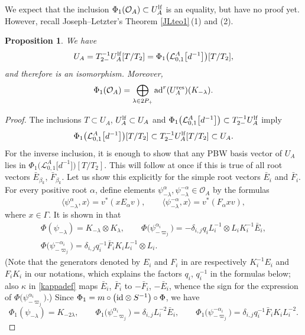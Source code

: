 \documentclass[10pt,a4paper]{amsart}
\numberwithin{equation}{section}
\newtheorem{prop}[teo]{Proposition}
\theoremstyle{definition}
\newcommand{\Ll}{{\mathcal L}}
\newcommand{\Oo}{{\mathcal O}}
\newcommand{\ra}{\rightarrow}
\begin{document}
We expect that the inclusion $\Phi_1(\Oo_A) \subset U_A^{\rm lf}$ is an equality, but have no proof yet. However, recall Joseph--Letzter's Theorem \ref{JLteo1}\,(1) and (2).
\begin{prop} \label{JLteo1overA} We have
\[
U_A = T_{2-}^{-1}U_A^{\rm lf}[T/T_{2}]=\Phi_1\big(\Ll_{0,1}^A\big[d^{-1}\big]\big)[T/T_{2}],\]
 and therefore \smash{$\Phi_1\colon \Ll_{0,1}^A\big[d^{-1}\big] \ra T_{2-}^{-1}U_A^{\rm lf}$} is an isomorphism. Moreover, \[\Phi_1(\Oo_A) = \bigoplus_{\lambda \in 2P_+} {\rm ad}^r(U_A^{\rm res})(K_{-\lambda}).\]
\end{prop}
\begin{proof} The inclusions $T\subset U_A$, $U_A^{\rm lf}\subset U_A$ and $\Phi_1\bigl(\Ll_{0,1}^A\big[d^{-1}\big]\bigr)\subset T_{2-}^{-1}U_A^{\rm lf}$ imply
\[\Phi_1\big(\Ll_{0,1}^A\big[d^{-1}\big]\big)[T/T_{2}]\subset T_{2-}^{-1}U_A^{\rm lf}[T/T_{2}]\subset U_A.\]
For the inverse inclusion, it is enough to show that any PBW basis vector of $U_A$ lies in $\Phi_1\big(\Ll_{0,1}^A\big[d^{-1}\big]\big)[T/T_{2}]$. This will follow at once if this is true of all root vectors $\bar{E}_{\beta_k}$, $\bar{F}_{\beta_k}$. Let us show this explicitly for the simple root vectors $\bar{E}_i$ and $\bar{F}_i$. For every positive root $\alpha$, define elements $\psi_{-\lambda}^{\alpha},\psi_{-\lambda}^{-\alpha}\in \Oo_A$ by the formulas
\[\langle \psi^{\alpha}_{-\lambda},x\rangle = v^*(xE_{\alpha} v),\qquad \langle \psi_{-\lambda}^{-\alpha},x\rangle = v^*(F_{\alpha} xv),\]
where $x\in \Gamma$. It is shown in \cite[Lemma~4.5]{DC-L} that
\begin{gather*}
\Phi(\psi_{-\lambda}) = K_{-\lambda} \otimes K_{\lambda},\qquad \Phi\big(\psi^{\alpha_i}_{-\varpi_j}\big) = - \delta_{i,j}q_i L_i^{-1} \otimes L_i K_i^{-1} \bar{E}_i, \\
 \Phi\big(\psi^{-\alpha_i}_{-\varpi_j}\big) =\delta_{i,j}q_i^{-1}\bar{F}_i K_i L_i^{-1}\otimes L_i .
\end{gather*}
\big(Note that the generators denoted by $E_i$ and $F_i$ in \cite{DC-L} are respectively $K_i^{-1}E_i$ and $F_iK_i$ in our notations, which explains the factors $q_i$, $q_i^{-1}$ in the formulas below; also $\kappa$ in \eqref{kappadef} maps $\bar{E}_i$, $\bar{F}_i$ to $-\bar{F}_i$, $-\bar{E}_i$, whence the sign for the expression of $\Phi\big(\psi^{\alpha_i}_{-\varpi_j}\big)$.\big) Since $\Phi_1 = m\circ \big({\rm id}\otimes S^{-1}\big)\circ \Phi$, we have
\begin{equation}
\label{formphi1K}
 \Phi_1(\psi_{-\lambda}) = K_{-2\lambda},\qquad \Phi_1\big(\psi^{\alpha_i}_{-\varpi_j}\big) =\delta_{i,j} L_i^{-2} \bar{E}_i ,\qquad \Phi_1\big(\psi^{-\alpha_i}_{-\varpi_j}\big) = \delta_{i,j}q_i^{-1}\bar{F}_i K_i L_i^{-2}.

\end{equation}
\end{proof}
\end{document}
